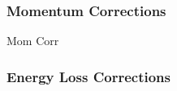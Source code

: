 \subsubsection{Momentum Corrections}{Mom Corr}\label{sec:momcorr}

\subsubsection{Energy Loss Corrections}
    